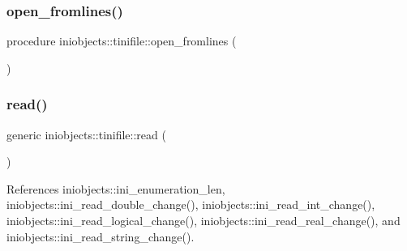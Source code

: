 \mbox{\label{structiniobjects_1_1tinifile_a11870953424653f03a444cdb77064275}} 
\subsubsection{\texorpdfstring{open\+\_\+fromlines()}{open\_fromlines()}}
{\footnotesize\ttfamily procedure iniobjects\+::tinifile\+::open\+\_\+fromlines (\begin{DoxyParamCaption}{ }\end{DoxyParamCaption})\hspace{0.3cm}{\ttfamily [private]}}

\mbox{\label{structiniobjects_1_1tinifile_a1951ddeeb06721386528087a2645b80d}} 
\subsubsection{\texorpdfstring{read()}{read()}}
{\footnotesize\ttfamily generic iniobjects\+::tinifile\+::read (\begin{DoxyParamCaption}{ }\end{DoxyParamCaption})\hspace{0.3cm}{\ttfamily [private]}}



References iniobjects\+::ini\+\_\+enumeration\+\_\+len, iniobjects\+::ini\+\_\+read\+\_\+double\+\_\+change(), iniobjects\+::ini\+\_\+read\+\_\+int\+\_\+change(), iniobjects\+::ini\+\_\+read\+\_\+logical\+\_\+change(), iniobjects\+::ini\+\_\+read\+\_\+real\+\_\+change(), and iniobjects\+::ini\+\_\+read\+\_\+string\+\_\+change().

